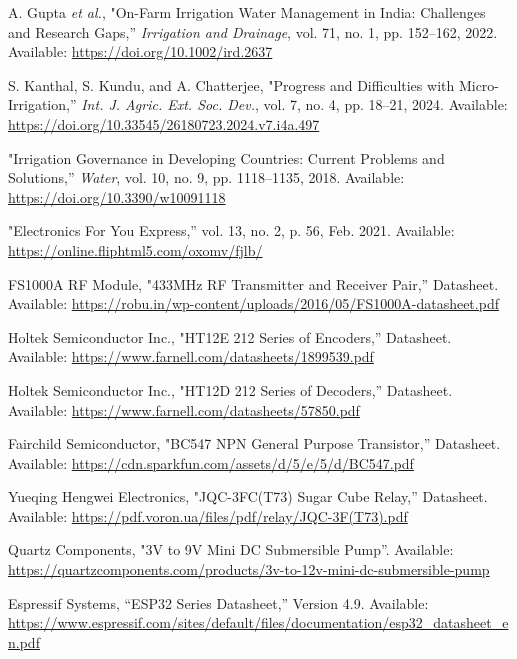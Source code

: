 \renewcommand{\bibname}{References}
\begin{thebibliography}{9}

  \label{gupta2022}
  A. Gupta \textit{et al.}, "On-Farm Irrigation Water Management in India: Challenges and Research Gaps,” \textit{Irrigation and Drainage}, vol. 71, no. 1, pp. 152–162, 2022. Available: \url{https://doi.org/10.1002/ird.2637}

  \label{kanthal2024}
  S. Kanthal, S. Kundu, and A. Chatterjee, "Progress and Difficulties with Micro-Irrigation,” \textit{Int. J. Agric. Ext. Soc. Dev.}, vol. 7, no. 4, pp. 18–21, 2024. Available: \url{https://doi.org/10.33545/26180723.2024.v7.i4a.497}

  \label{water2018}
  "Irrigation Governance in Developing Countries: Current Problems and Solutions,” \textit{Water}, vol. 10, no. 9, pp. 1118–1135, 2018. Available: \url{https://doi.org/10.3390/w10091118}

  \label{efy}
  "Electronics For You Express,” vol. 13, no. 2, p. 56, Feb. 2021. Available: \url{https://online.fliphtml5.com/oxomv/fjlb/}

  \label{fs1000a}
  FS1000A RF Module, "433MHz RF Transmitter and Receiver Pair,” Datasheet. Available: \url{https://robu.in/wp-content/uploads/2016/05/FS1000A-datasheet.pdf}

  \label{ht12e}
  Holtek Semiconductor Inc., "HT12E 212 Series of Encoders,” Datasheet. Available: \url{https://www.farnell.com/datasheets/1899539.pdf}

  \label{ht12d}
  Holtek Semiconductor Inc., "HT12D 212 Series of Decoders,” Datasheet. Available: \url{https://www.farnell.com/datasheets/57850.pdf}

  \label{bc547}
  Fairchild Semiconductor, "BC547 NPN General Purpose Transistor,” Datasheet. Available: \url{https://cdn.sparkfun.com/assets/d/5/e/5/d/BC547.pdf}

  \label{jqc}
  Yueqing Hengwei Electronics, "JQC-3FC(T73) Sugar Cube Relay,” Datasheet. Available: \url{https://pdf.voron.ua/files/pdf/relay/JQC-3F(T73).pdf}
  
	\label{pump}
  Quartz Components, "3V to 9V Mini DC Submersible Pump”. Available: \url{https://quartzcomponents.com/products/3v-to-12v-mini-dc-submersible-pump}
	
	\label{esp32}
  Espressif Systems, “ESP32 Series Datasheet,” Version 4.9. Available: \url{https://www.espressif.com/sites/default/files/documentation/esp32_datasheet_en.pdf}

\end{thebibliography}

